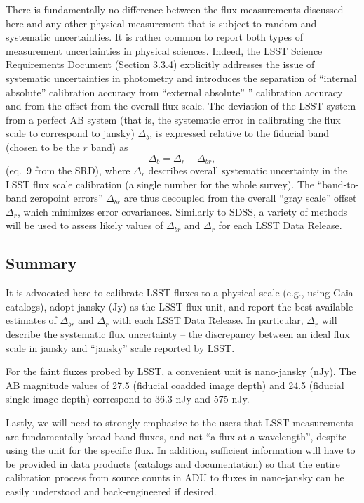 \documentclass[DM,toc]{lsstdoc}
\begin{document}
There is fundamentally no difference between the flux measurements discussed
here and any other physical measurement that is subject to random and systematic
uncertainties. It is rather common to report both types of measurement uncertainties
in physical sciences. Indeed, the LSST  Science Requirements Document (Section 3.3.4)
explicitly addresses the issue of systematic uncertainties in photometry and
introduces the separation of ``internal absolute'' calibration accuracy
from ``external absolute'' ” calibration accuracy and from the offset from the
overall flux scale. The deviation of the LSST system from a perfect AB system
(that is, the systematic error in calibrating the flux scale to correspond to jansky)
$\Delta_b$, is expressed relative to the fiducial band (chosen to be the $r$ band)
as \begin{equation}
             \Delta_b = \Delta_r + \Delta_{br},
\end{equation}
(eq.~9 from the SRD), where $\Delta_r$ describes overall systematic uncertainty
in the LSST flux scale calibration (a single number for the whole survey). The
``band-to-band zeropoint errors'' $\Delta_{br}$ are thus decoupled from the overall
``gray scale'' offset $\Delta_{r}$, which minimizes error covariances. Similarly to SDSS,
a variety of methods will be used to assess likely values of $\Delta_{br}$ and
$\Delta_r$ for each LSST Data Release.


\subsection{Summary}

It is advocated here to calibrate LSST fluxes to a physical scale (e.g., using
Gaia catalogs), adopt jansky (Jy) as the LSST flux unit, and report the best available
estimates of $\Delta_{br}$ and $\Delta_r$ with each LSST Data Release. In particular,
$\Delta_r$ will describe the systematic flux uncertainty --  the discrepancy between an
ideal flux scale in jansky and ``jansky'' scale reported by LSST.

For the faint fluxes probed by LSST, a convenient unit is nano-jansky (nJy).
The AB magnitude values of 27.5 (fiducial coadded image depth)  and 24.5 (fiducial
single-image depth) correspond to 36.3 nJy and 575 nJy.

Lastly, we will need to strongly emphasize to the users that LSST measurements are
fundamentally broad-band fluxes, and not ``a flux-at-a-wavelength'', despite using the
unit for the specific flux. In addition, sufficient information will have to be provided
in data products (catalogs and documentation) so that the entire calibration process from
source counts in ADU to fluxes in nano-jansky can be easily understood and back-engineered
if desired.
\end{document}
